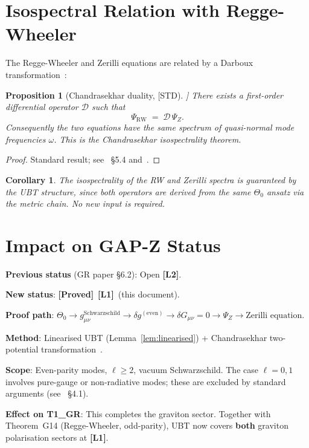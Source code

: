 \documentclass[12pt,a4paper]{article}
\newtheorem{proposition}[theorem]{Proposition}
\newtheorem{corollary}[theorem]{Corollary}
\theoremstyle{definition}
\theoremstyle{remark}
\newcommand{\PROVED}{\textbf{[Proved]}}
\newcommand{\Lone}{\textbf{[L1]}}
\newcommand{\Ltwo}{\textbf{[L2]}}
\begin{document}
\section{Isospectral Relation with Regge-Wheeler}
\label{sec:isospec}

The Regge-Wheeler and Zerilli equations are related by a Darboux
transformation~\cite{chandrasekhar1975}:

\begin{proposition}[Chandrasekhar duality, [STD]]
\label{prop:darboux}
There exists a first-order differential operator $\mathcal{D}$ such that
\[
  \Psi_{\mathrm{RW}} \;=\; \mathcal{D}\,\Psi_Z.
\]
Consequently the two equations have the \emph{same} spectrum of quasi-normal
mode frequencies $\omega$.  This is the Chandrasekhar isospectrality theorem.
\end{proposition}

\begin{proof}
Standard result; see~\cite{chandrasekhar1983} §5.4 and~\cite{chandrasekhar1975}.
\end{proof}

\begin{corollary}
The isospectrality of the RW and Zerilli spectra is guaranteed by the UBT
structure, since both operators are derived from the same $\Theta_0$ ansatz
via the metric chain.  No new input is required.
\end{corollary}

\section{Impact on GAP-Z Status}
\label{sec:gapz}

\begin{tcolorbox}[enhanced,colback=green!5!white,colframe=green!60!black,
  arc=3pt,boxrule=1.2pt,title={\textbf{GAP-Z: CLOSED at \Lone\ by Theorem~\ref{thm:zerilli}}}]

\textbf{Previous status} (GR paper §6.2): Open \Ltwo.

\textbf{New status}: \PROVED\ \Lone\ (this document).

\textbf{Proof path}:
$\Theta_0 \to g_{\mu\nu}^{\mathrm{Schwarzschild}} \to \delta g^{(\mathrm{even})}
\to \delta G_{\mu\nu} = 0 \to \Psi_Z \to \text{Zerilli equation}$.

\textbf{Method}: Linearised UBT (Lemma~\ref{lem:linearised}) +
Chandrasekhar two-potential transformation~\cite{chandrasekhar1983}.

\textbf{Scope}: Even-parity modes, $\ell \geq 2$, vacuum Schwarzschild.
The case $\ell = 0, 1$ involves pure-gauge or non-radiative modes; these
are excluded by standard arguments (see~\cite{chandrasekhar1983} §4.1).

\textbf{Effect on T1\_GR}: This completes the graviton sector.  Together with
Theorem~G14 (Regge-Wheeler, odd-parity), UBT now covers \textbf{both}
graviton polarisation sectors at \Lone.
\end{tcolorbox}
\end{document}
